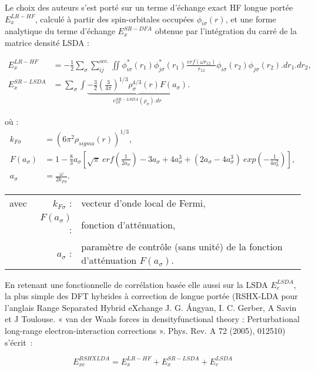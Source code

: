 	Le choix des auteurs s'est porté sur un terme d'échange exact HF longue portée $E_{x}^{LR-HF}$, calculé à partir des spin-orbitales occupées $\phi_{i \sigma}(r)$, et une forme analytique du terme d'échange $E_{x}^{SR-DFA}$ obtenue par l'intégration du carré de la matrice densité LSDA :
	
	\begin{align}
	E_{x}^{LR-HF} &= -\frac{1}{2} \sum_{\sigma} \sum_{ij}^{occ.} \iint \phi_{i \sigma}^{*}(r_{1}) \phi_{j \sigma}^{*}(r_{1}) \frac{erf(\omega r_{12})}{r_{12}} \phi_{i \sigma}(r_{2}) \phi_{j \sigma}(r_{2}).dr_{1}.dr_{2}, \\
	E_{x}^{SR-LSDA} &= \sum_{\sigma} \int \underbrace{-\frac{3}{2}\left(\frac{3}{4\pi}\right)^{1/3}\rho_{\sigma}^{4/3} (r) F(a_{\sigma})}_{e_{x \sigma}^{SR-LSDA} (\rho_{\sigma}) .dr}.
	\end{align}
	
	\noindent où :
	\begin{align}
	k_{F \sigma}&=(6\pi^{2}\rho_{sigma}(r))^{1/3},\nonumber\\
	F(a_{\sigma})&=1-\frac{8}{3}a_{\sigma}\left[\sqrt{\pi}\: erf\left(\frac{1}{2a_{\sigma}}\right)-3a_{\sigma}+4a_{\sigma}^{3}+(2a_{\sigma}-4a_{\sigma}^{3}) \: exp\left(-\frac{1}{4a_{\sigma}^{2}}\right)\right],\nonumber\\
	a_{\sigma}&=\frac{\omega}{2k_{F\sigma}}.\nonumber
	\end{align}
	
	\begin{flushleft}
		\begin{tabular}{@{}lrp{10cm}}
			avec & $k_{F\sigma}$ : & vecteur d'onde local de Fermi,\\
			& $F(a_{\sigma})$ : & fonction d'atténuation,\\
			& $a_{\sigma}$ : & paramètre de contrôle (sans unité) de la fonction d'atténuation $F(a_{\sigma})$.
		\end{tabular}
	\end{flushleft}
	
	En retenant une fonctionnelle de corrélation basée elle aussi sur la LSDA $E_{c}^{LSDA}$, la plus simple des DFT hybrides à correction de longue portée (RSHX-LDA pour l’anglais Range Separated Hybrid eXchange J. G. Ángyan, I. C. Gerber, A Savin et J Toulouse. « van der Waals forces in densityfunctional theory : Perturbational long-range electron-interaction corrections ». Phys. Rev. A 72 (2005), 012510) s'écrit~:
	
	\begin{equation}
	E_{xc}^{RSHXLDA} = E_{x}^{LR-HF} + E_{x}^{SR-LSDA} + E_{c}^{LSDA}
	\end{equation}
	
